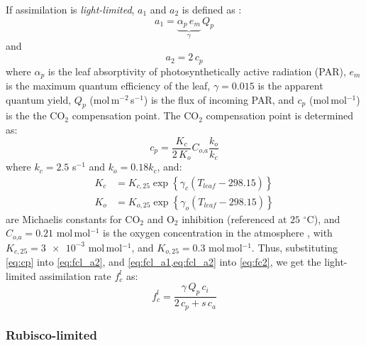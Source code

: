If assimilation is \textit{light-limited}, $a_1$ and $a_2$ is defined as \citep{Manoli2014,Katul2010}:
\begin{equation}
a_1 = \underbrace{\alpha_p\, e_m}_{\gamma}\, Q_p
\label{eq:fcl_a1}
\end{equation}
and 
\begin{equation}
a_2 = 2\,c_p
\label{eq:fcl_a2}
\end{equation}
where $\alpha_p$ is the leaf absorptivity of photosynthetically active radiation (PAR), $e_m$ is the maximum quantum efficiency of the leaf, $\gamma = 0.015$ is the apparent quantum yield, $Q_p$ (mol\,m$^{-2}$\,s$^{-1}$) is the flux of incoming PAR, and $c_p$ (mol\,mol$^{-1}$) is the the CO$_2$ compensation point. The CO$_2$ compensation point is determined as:
\begin{equation}
c_p = \frac{K_c}{2\,K_o} C_{\textit{o,a}} \frac{k_o}{k_c}
\label{eq:cp}
\end{equation}
where $k_c = 2.5$ s$^{-1}$ and $k_o = 0.18 k_c$, and:
\begin{align}
K_c &= K_{c,25} \exp\left\{ \gamma_c \left(T_{\textit{leaf}} - 298.15\right)\right\} \\
K_o &= K_{o,25} \exp\left\{ \gamma_o \left(T_{\textit{leaf}} - 298.15\right)\right\}
\end{align}
are Michaelis constants for CO$_2$ and O$_2$ inhibition (referenced at $25$ $^{\circ}$C), and $C_{\textit{o,a}} = 0.21$ mol\,mol$^{-1}$ is the oxygen concentration in the atmosphere \citep{Farquhar1980}, with $K_{c,25} = \num{3e-3}$ mol\,mol$^{-1}$, and $K_{o,25} = 0.3$ mol\,mol$^{-1}$. Thus, substituting \cref{eq:cp} into \cref{eq:fcl_a2}, and  \cref{eq:fcl_a1,eq:fcl_a2} into \cref{eq:fc2}, we get the light-limited assimilation rate $f_c^l$ as:
\begin{equation}
f_c^l = \frac{\gamma\,Q_p\,c_i}{2\,c_p + s\,c_a}
\end{equation}

\subsubsection*{Rubisco-limited}

